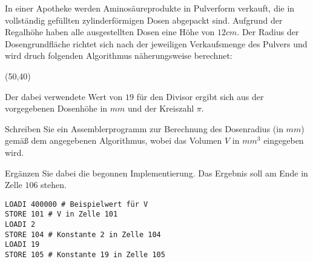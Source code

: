 \documentclass{bschlangaul-aufgabe}
\begin{document}

In einer Apotheke werden Aminosäureprodukte in Pulverform verkauft, die
in vollständig gefüllten zylinderförmigen Dosen abgepackt sind. Aufgrund
der Regalhöhe haben alle ausgestellten Dosen eine Höhe von $12cm$. Der
Radius der Dosengrundfläche richtet sich nach der jeweiligen
Verkaufsmenge des Pulvers und wird druch folgenden Algorithmus
näherungsweise berechnet:

\begin{center}
\begin{struktogramm}(50,40)
  \whileend
{}
\end{struktogramm}
\end{center}

\noindent
Der dabei verwendete Wert von $19$ für den Divisor ergibt sich aus der
vorgegebenen Dosenhöhe in $mm$ und der Kreiszahl $\pi$.

Schreiben Sie ein Assemblerprogramm zur Berechnung des Dosenradius (in
$mm$) gemäß dem angegebenen Algorithmus, wobei das Volumen $V$ in $mm^3$
eingegeben wird.

Ergänzen Sie dabei die begonnen Implementierung. Das Ergebnis soll am
Ende in Zelle $106$ stehen.

\begin{verbatim}
LOADI 400000 # Beispielwert für V
STORE 101 # V in Zelle 101
LOADI 2
STORE 104 # Konstante 2 in Zelle 104
LOADI 19
STORE 105 # Konstante 19 in Zelle 105
\end{verbatim}

\begin{bAntwort}

%



%



%


\end{bAntwort}
\end{document}
